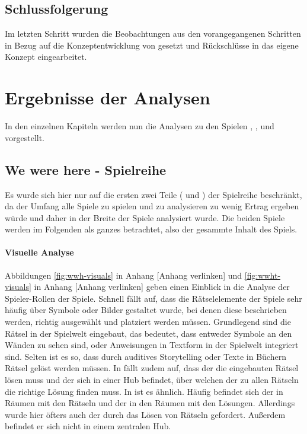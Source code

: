 \subsection{Schlussfolgerung}
Im letzten Schritt wurden die Beobachtungen aus den vorangegangenen Schritten in Bezug auf die Konzeptentwicklung von  gesetzt und Rückschlüsse in das eigene Konzept eingearbeitet.

\section{Ergebnisse der Analysen}
In den einzelnen Kapiteln werden nun die Analysen zu den Spielen , ,  und  vorgestellt.

\subsection{We were here - Spielreihe}
Es wurde sich hier nur auf die ersten zwei Teile ( und ) der Spielreihe beschränkt, da der Umfang alle Spiele zu spielen und zu analysieren zu wenig Ertrag ergeben würde und daher in der Breite der Spiele analysiert wurde. Die beiden Spiele werden im Folgenden als ganzes betrachtet, also der gesammte Inhalt des Spiels.

\paragraph{Visuelle Analyse}
Abbildungen \ref{fig:wwh-visuals} in Anhang [Anhang verlinken] und \ref{fig:wwht-visuals} in Anhang [Anhang verlinken] geben einen Einblick in die Analyse der Spieler-Rollen der Spiele. Schnell fällt auf, dass die Rätselelemente der Spiele sehr häufig über Symbole oder Bilder gestaltet wurde, bei denen diese beschrieben werden, richtig ausgewählt und platziert werden müssen. Grundlegend sind die Rätsel in der Spielwelt eingebaut, das bedeutet, dass entweder Symbole an den Wänden zu sehen sind, oder Anweisungen in Textform in der Spielwelt integriert sind. Selten ist es so, dass durch auditives Storytelling oder Texte in Büchern Rätsel gelöst werden müssen. In  fällt zudem auf, dass der  die eingebauten Rätsel lösen muss und der  sich in einer Hub befindet, über welchen der zu allen Rätseln die richtige Lösung finden muss. In  ist es ähnlich. Häufig befindet sich der  in Räumen mit den Rätseln und der  in den Räumen mit den Lösungen. Allerdings wurde hier öfters auch der  durch das Lösen von Rätseln gefordert. Außerdem befindet er sich nicht in einem zentralen Hub.

